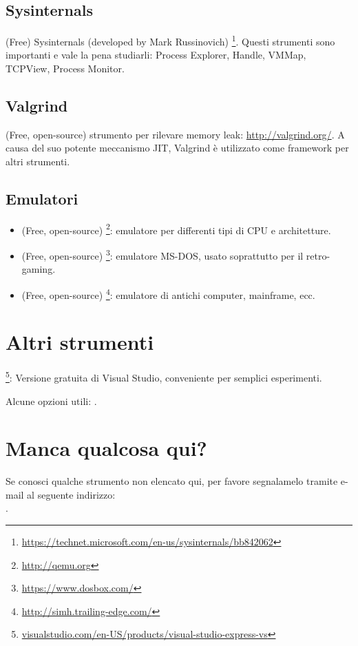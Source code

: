 \subsection{Sysinternals}

(Free) Sysinternals (developed by Mark Russinovich)
\footnote{\url{https://technet.microsoft.com/en-us/sysinternals/bb842062}}.
Questi strumenti sono importanti e vale la pena studiarli: Process Explorer, Handle, VMMap, TCPView, Process Monitor.

\subsection{Valgrind}

(Free, open-source) strumento per rilevare memory leak: \url{http://valgrind.org/}.
A causa del suo potente meccanismo \ac{JIT}, Valgrind è utilizzato come framework per altri strumenti.


\subsection{Emulatori}

\begin{itemize}
\item (Free, open-source) \footnote{\url{http://qemu.org}}: emulatore per differenti tipi di CPU e architetture.

\item (Free, open-source) \footnote{\url{https://www.dosbox.com/}}: emulatore MS-DOS, usato soprattutto per il retro-gaming.

\item (Free, open-source) \footnote{\url{http://simh.trailing-edge.com/}}: emulatore di antichi computer, mainframe, ecc.
\end{itemize}

\section{Altri strumenti}

\footnote{\href{http://go.yurichev.com/17034}{visualstudio.com/en-US/products/visual-studio-express-vs}}:
Versione gratuita di Visual Studio, conveniente per semplici esperimenti.

Alcune opzioni utili: .

\section{Manca qualcosa qui?}

Se conosci qualche strumento non elencato qui, per favore segnalamelo tramite e-mail al seguente indirizzo:\\
\TT{\EMAIL}.

